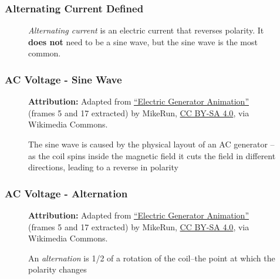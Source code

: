 \begin{frame}
    \frametitle{Alternating Current Defined}

    \begin{figure}
        \centering
        \resizebox{0.75\linewidth}{!}{
            
        }

        {\footnotesize \emph{Alternating current} is an electric current that reverses polarity. It \textbf{does not} need to be a sine wave, but the sine wave is the most common.\par}

    \end{figure}

\end{frame}

\begin{frame}
    \frametitle{AC Voltage - Sine Wave}

    \begin{figure}
        \centering
        \resizebox{0.48\linewidth}{!}{
            
        }

        {\tiny \textbf{Attribution:} Adapted from \href{https://commons.wikimedia.org/wiki/File:Electric-generator-animation.gif}{``Electric Generator Animation''} (frames 5 and 17 extracted) by MikeRun, \href{https://creativecommons.org/licenses/by-sa/4.0}{CC BY-SA 4.0}, via Wikimedia Commons.\\[0.5em]}

        {\footnotesize The sine wave is caused by the physical layout of an AC generator -- as the coil spins inside the magnetic field it cuts the field in different directions, leading to a reverse in polarity\par}

    \end{figure}

\end{frame}

\begin{frame}
    \frametitle{AC Voltage - Alternation}

    \begin{figure}
        \centering
        \resizebox{0.48\linewidth}{!}{
            
        }

        {\tiny \textbf{Attribution:} Adapted from \href{https://commons.wikimedia.org/wiki/File:Electric-generator-animation.gif}{``Electric Generator Animation''} (frames 5 and 17 extracted) by MikeRun, \href{https://creativecommons.org/licenses/by-sa/4.0}{CC BY-SA 4.0}, via Wikimedia Commons.\\[0.5em]}

        {\footnotesize An \emph{alternation} is 1/2 of a rotation of the coil--the point at which the polarity changes\par}

    \end{figure}

\end{frame}

